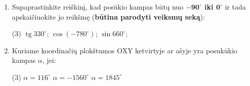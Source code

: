 \documentclass[a4paper]{article}
\DeclareMathOperator{\tg}{tg}
\begin{document}
\begin{enumerate}
      \item Supaprastinkite reiškinį, kad posūkio kampas būtų nuo
            \textbf{$\boldsymbol{-90^\circ}$
                  iki  $\boldsymbol{0^\circ}$} ir tada apskaičiuokite jo
            reikšmę
            (\textbf{būtina parodyti veiksmų seką}):
            \begin{tasks}[item-format={\normalfont},
                        after-item-skip=4mm](3)
                  \task $\tg 330^\circ$;
                  \task $\cos (-780^\circ)$;
                  \task $\sin 660^\circ$;
            \end{tasks}

      \item Kuriame koordinačių plokštumos OXY ketvirtyje ar ašyje yra
            posukūkio kampas $\alpha$, jei:

            \begin{tasks}[item-format={\normalfont},
                        after-item-skip=4mm](3)
                  \task $\alpha = 116^\circ$
                  \task $\alpha = -1560^\circ$
                  \task $\alpha = 1845^\circ$
            \end{tasks}

\end{enumerate}
\end{document}
